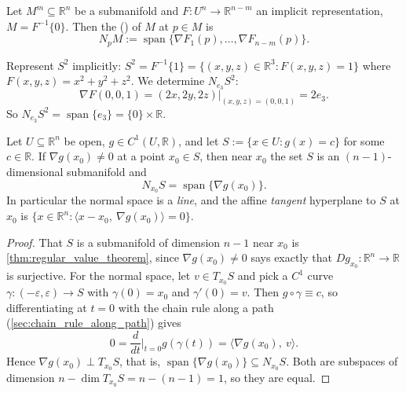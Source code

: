 \begin{definition}
\label{def:normal_space}
Let $M^m \subseteq \mathbb{R}^n$ be a submanifold and $F : U^n \to \mathbb{R}^{n-m}$ an implicit
representation, $M = F^{-1}\{0\}$. Then the  () of
$M$ at $p \in M$ is
\[N_pM := \operatorname{span}\{\nabla F_1(p),\dots,\nabla F_{n-m}(p)\}.\]
\end{definition}

\begin{example}
Represent $S^2$ implicitly: $S^2 = F^{-1}\{1\} = \{(x,y,z)\in\mathbb{R}^3 : F(x,y,z)=1\}$ where
$F(x,y,z) = x^2+y^2+z^2$. We determine $N_{e_3}S^2$:
\[\nabla F(0,0,1) = (2x,2y,2z)\big|_{(x,y,z)=(0,0,1)} = 2e_3.\]
So $N_{e_3}S^2 = \operatorname{span}\{e_3\} = \{0\}\times\mathbb{R}$.
\end{example}

\begin{proposition}
\label{prop:gradient_orthogonality_level_sets}
Let $U \subseteq \mathbb{R}^n$ be open, $g \in C^1(U,\mathbb{R})$, and let
$S := \{x \in U : g(x) = c\}$ for some $c \in \mathbb{R}$. If $\nabla g(x_0) \neq 0$ at a point
$x_0 \in S$, then near $x_0$ the set $S$ is an $(n-1)$-dimensional submanifold and
\[N_{x_0}S = \operatorname{span}\{\nabla g(x_0)\}.\]
In particular the normal space is a \emph{line}, and the affine \emph{tangent} hyperplane to $S$
at $x_0$ is $\{x \in \mathbb{R}^n : \langle x - x_0,\ \nabla g(x_0)\rangle = 0\}$.
\end{proposition}

\begin{proof}
That $S$ is a submanifold of dimension $n-1$ near $x_0$ is \cref{thm:regular_value_theorem},
since $\nabla g(x_0) \neq 0$ says exactly that $Dg_{x_0} : \mathbb{R}^n \to \mathbb{R}$ is
surjective. For the normal space, let $v \in T_{x_0}S$ and pick a $C^1$ curve
$\gamma : (-\varepsilon,\varepsilon) \to S$ with $\gamma(0) = x_0$ and $\gamma'(0) = v$. Then
$g \circ \gamma \equiv c$, so differentiating at $t=0$ with the chain rule along a path
(\cref{sec:chain_rule_along_path}) gives
\[0 = \frac{d}{dt}\Big|_{t=0}g(\gamma(t)) = \big\langle \nabla g(x_0),\ v\big\rangle.\]
Hence $\nabla g(x_0) \perp T_{x_0}S$, that is,
$\operatorname{span}\{\nabla g(x_0)\} \subseteq N_{x_0}S$. Both are subspaces of dimension
$n - \dim T_{x_0}S = n-(n-1) = 1$, so they are equal.
\end{proof}

